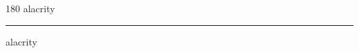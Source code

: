
\begin{frame}
\begin{center}
\begin{turn}{180}
{\fontsize{2.5cm}{1em}\selectfont alacrity}
\end{turn}
\vspace{1em}\par  
\hrule
\vspace{1em}\par  
{\fontsize{2.5cm}{1em}\selectfont alacrity}
\end{center}
\end{frame}
